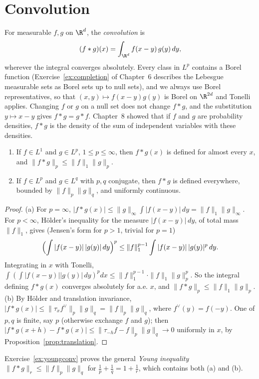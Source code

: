 \section{Convolution}

For measurable $f,g$ on $\R^d$, the \emph{convolution} is
\[(f*g)(x)=\int_{\R^d}f(x-y)\,g(y)\,dy,\]
wherever the integral converges absolutely. Every class in $L^p$ contains a Borel function (Exercise~\ref{ex:completion} of Chapter~6 describes the Lebesgue measurable sets as Borel sets up to null sets), and we always use
Borel representatives, so that $(x,y)\mapsto f(x-y)g(y)$ is Borel on $\R^{2d}$ and Tonelli applies. Changing $f$ or $g$ on a null set does not change $f*g$, and the substitution $y\mapsto x-y$ gives $f*g=g*f$.
Chapter~8 showed that if $f$ and $g$ are probability densities, $f*g$ is the density of the sum of independent variables with these densities.

\begin{proposition}\label{prop:convolution}
\begin{enumerate}[label=(\alph*)]
\item If $f\in L^1$ and $g\in L^p$, $1\le p\le\infty$, then $f*g(x)$ is defined for almost every $x$, and $\|f*g\|_p\le\|f\|_1\|g\|_p$.
\item If $f\in L^p$ and $g\in L^q$ with $p,q$ conjugate, then $f*g$ is defined everywhere, bounded by $\|f\|_p\|g\|_q$, and uniformly continuous.
\end{enumerate}
\end{proposition}
\begin{proof}
(a) For $p=\infty$, $|f*g(x)|\le\|g\|_\infty\int|f(x-y)|\,dy=\|f\|_1\|g\|_\infty$. For $p<\infty$, H\"older's inequality for the measure $|f(x-y)|\,dy$, of total mass $\|f\|_1$, gives (Jensen's form for $p>1$, trivial
for $p=1$)
\[\Bigl(\int|f(x-y)|\,|g(y)|\,dy\Bigr)^p\le\|f\|_1^{p-1}\int|f(x-y)|\,|g(y)|^p\,dy.\]
Integrating in $x$ with Tonelli, $\int(\int|f(x-y)||g(y)|\,dy)^pdx\le\|f\|_1^{p-1}\cdot\|f\|_1\|g\|_p^p$. So the integral defining $f*g(x)$ converges absolutely for a.e. $x$, and $\|f*g\|_p\le\|f\|_1\|g\|_p$.
(b) By H\"older and translation invariance, $|f*g(x)|\le\|\tau_xf^\vee\|_p\|g\|_q=\|f\|_p\|g\|_q$, where $f^\vee(y)=f(-y)$. One of $p,q$ is finite, say $p$ (otherwise exchange $f$ and $g$); then
$|f*g(x+h)-f*g(x)|\le\|\tau_{-h}f-f\|_p\|g\|_q\to0$ uniformly in $x$, by Proposition~\ref{prop:translation}.
\end{proof}

Exercise~\ref{ex:youngconv} proves the general \emph{Young inequality} $\|f*g\|_r\le\|f\|_p\|g\|_q$ for $\frac1p+\frac1q=1+\frac1r$, which contains both (a) and (b).

